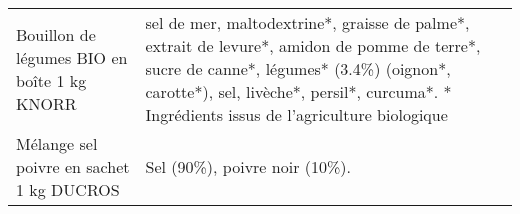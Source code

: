 \begin{longtable}{p{5cm}p{10cm}}
                                                              Bouillon de légumes BIO en boîte 1 kg KNORR &                                                                                                                                                                                                                                                                                                                                                                                                                                                                                                                                                                                                                                                                                                                                                                                                   sel de mer, maltodextrine*, graisse de palme*, extrait de levure*, amidon de pomme de terre*, sucre de canne*, légumes* (3.4\%) (oignon*, carotte*), sel, livèche*, persil*, curcuma*.  * Ingrédients issus de l'agriculture biologique \\
                                                                 Mélange sel poivre en sachet 1 kg DUCROS &                                                                                                                                                                                                                                                                                                                                                                                                                                                                                                                                                                                                                                                                                                                                                                                                                                                                                                                                                                                                            Sel (90\%), poivre noir (10\%). \\

\end{longtable}
